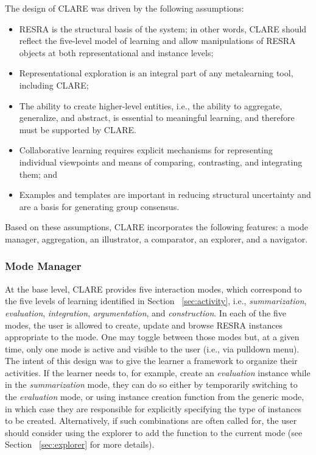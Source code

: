 The design of CLARE was driven by the following assumptions:

\begin{itemize}
\item RESRA is the structural basis of the system; in other words, CLARE
  should reflect the five-level model of learning and allow manipulations of
  RESRA objects at both representational and instance levels;
  
\item Representational exploration is an integral part of any metalearning
  tool, including CLARE;
  
\item The ability to create higher-level entities, i.e., the ability to
  aggregate, generalize, and abstract, is essential to meaningful learning,
  and therefore must be supported by CLARE.
  
\item Collaborative learning requires explicit mechanisms for representing
  individual viewpoints and means of comparing, contrasting, and integrating
  them; and
  
\item Examples and templates are important in reducing structural
  uncertainty and are a basis for generating group consensus.
\end{itemize}

Based on these assumptions, CLARE incorporates the following features: a
mode manager, aggregation, an illustrator, a comparator, an explorer, and a
navigator.

\subsubsection{Mode Manager}

At the base level, CLARE provides five interaction modes, which correspond
to the five levels of learning identified in Section ~\ref{sec:activity},
i.e., {\it summarization\/}, {\it evaluation\/}, {\it integration\/}, {\it
argumentation\/}, and {\it construction\/}. In each of the five modes, the
user is allowed to create, update and browse RESRA instances appropriate to
the mode. One may toggle between those modes but, at a given time, only one
mode is active and visible to the user (i.e., via pulldown menu). The
intent of this design was to give the learner a framework to organize their
activities. If the learner needs to, for example, create an {\it
evaluation\/} instance while in the {\it summarization\/} mode, they can do
so either by temporarily switching to the {\it evaluation\/} mode, or using
instance creation function from the generic mode, in which case they are
responsible for explicitly specifying the type of instances to be created.
Alternatively, if such combinations are often called for, the user should
consider using the explorer to add the function to the current mode (see
Section ~\ref{sec:explorer} for more details).

